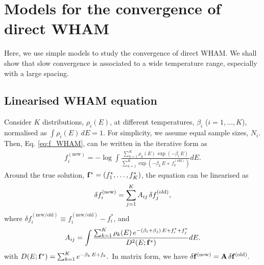 \documentclass{gMOS2e}
\begin{document}
\section{\label{sec:convwham}
Models for the convergence of direct WHAM}




Here, we use simple models
to study the convergence of direct WHAM.
%
We shall show that
slow convergence is
associated to a wide temperature range,
especially with a large spacing.





\subsection{Linearised WHAM equation}



Consider $K$ distributions, $\rho_i(E)$,
at different temperatures,
$\beta_i$ ($i = 1, \dots, K$),
%
normalised as
%
$
\int \rho_i(E) \, dE = 1.
$
%
%
%
For simplicity,
we assume equal sample sizes, $N_i$.
%
Then,
Eq. \eqref{eq:f_WHAM},
can be written
in the iterative form as
%
\begin{align}
f_i^\mathrm{(new)}
=
-\log
\int
\frac
{
  \sum_{k=1}^K \rho_k(E) \, \exp(-\beta_i \, E)
}
{
  \sum_{k=1}^K
  \exp(
    -\beta_k \, E + f_k^\mathrm{(old)}
  )
}
dE.
\label{eq:f_WHAM1}
\end{align}
%
Around the true solution,
$\mathbf{f}^* = (f_1^*, \dots, f_K^*)$,
the equation can be linearised as
%
\begin{align}
\delta f_i^\mathrm{(new)}
=
\sum_{j = 1}^K
A_{ij} \,
\delta f_j^\mathrm{(old)},
\notag
\end{align}
%
where
%
$\delta f_i^\mathrm{(new/old)}
\equiv f_i^\mathrm{(new/old)} - f_i^*$,
%
and
\begin{align}
  A_{ij}
=
\int
\frac
{
  \sum_{k=1}^K \rho_k(E) \,
    e^{
      -(\beta_i + \beta_j) \, E + f_i^* + f_j^*
    }
}
{
  D^2(E; \mathbf{f}^*)
}
dE.
\label{eq:Aij}
\end{align}
%
with
$
D(E; \mathbf{f}^*)
=
\sum_{k = 1}^K
  e^{
    -\beta_k \, E + f_k
  }.
$
%
In matrix form, we have
%
$
\delta \mathbf{f}^\mathrm{(new)}
=
\mathbf{A} \,
\delta \mathbf{f}^\mathrm{(old)}.
$
\end{document}

